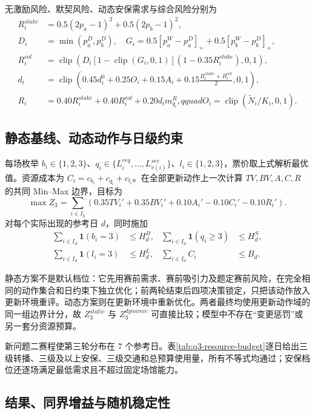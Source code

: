 无激励风险、默契风险、动态安保需求与综合风险分别为
\begin{align}
R_i^{stake}&=0.5(2p_a-1)^2+0.5(2p_b-1)^2,\\
D_i&=\min(p_a^D,p_b^D),\quad
G_i=0.5[p_a^W-p_a^D]_++0.5[p_b^W-p_b^D]_+,\\
R_i^{col}&=\operatorname{clip}\!\left(D_i[1-\operatorname{clip}(G_i,0,1)](1-0.35R_i^{stake}),0,1\right),\\
d_i&=\operatorname{clip}\!\left(0.45d_i^0+0.25O_i+0.15A_i+0.15\frac{R_i^{stake}+R_i^{col}}2,0,1\right),\\
R_i&=0.40R_i^{stake}+0.40R_i^{col}+0.20d_im_{q_i}^R,qquad
O_i=\operatorname{clip}(\widetilde N_i/K_i,0,1).
\end{align}

\subsection{静态基线、动态动作与日级约束}

每场枚举 $b_i\in\{1,2,3\}$、$q_i\in\{L_i^{req},\ldots,L_{v(i)}^{sec}\}$、$l_i\in\{1,2,3\}$，票价取上式解析最优值。资源成本为 $C_i=c_{b_i}+c_{q_i}+c_{l_i}$。在全部更新动作上一次计算 $TV,BV,A,C,R$ 的共同 Min--Max 边界，目标为
\begin{equation}
\max Z_3=\sum_{i\in I_3}\left(0.35TV_i'+0.35BV_i'+0.10A_i'-0.10C_i'-0.10R_i'\right).
\end{equation}
对每个实际出现的参考日 $d$，同时施加
\begin{align}
\sum_{i\in I_d}\mathbf 1(b_i=3)&\le H_d^B,&
\sum_{i\in I_d}\mathbf 1(q_i\ge3)&\le H_d^S,\\
\sum_{i\in I_d}\mathbf 1(l_i=3)&\le H_d^L,&
\sum_{i\in I_d}C_i&\le B_d.
\end{align}

静态方案不是默认档位：它先用赛前需求、赛前吸引力及题定赛前风险，在完全相同的动作集合和日约束下独立优化；前两轮结束后四项决策锁定，只把该动作放入更新环境重评。动态方案则在更新环境中重新优化。两者最终均使用更新动作域的同一组边界计分，故 $Z_3^{static}$ 与 $Z_3^{dynamic}$ 可直接比较；模型中不存在“变更惩罚”或另一套分资源预算。



新问题二赛程使第三轮分布在 $7$ 个参考日。表\ref{tab:q3-resource-budget}逐日给出三级转播、三级及以上安保、三级交通和总预算使用量，所有不等式均通过；安保档位还逐场满足最低需求且不超过固定场馆能力。

\subsection{结果、同界增益与随机稳定性}

